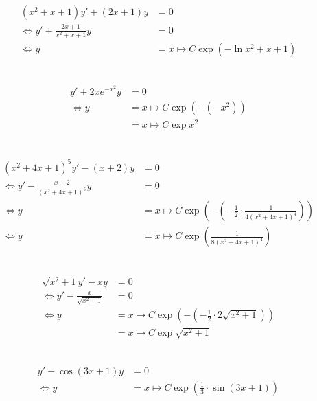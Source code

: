 \documentclass{article}
\begin{document}
\subsection{}

\begin{align*}
	(x^2 + x+1)y' + (2x+1)y &= 0 \\
	\iff y' + \frac{2x+1}{x^2+x+1}y &= 0 \\
	\iff y &= x \mapsto C \exp(-\ln x^2+x+1) \\
\end{align*}

\subsection{}

\begin{align*}
	y' + 2xe^{-x^2}y &= 0 \\
	\iff y &= x \mapsto C \exp (-(-x^2)) \\
	    &= x \mapsto C \exp x^2 \\
\end{align*}

\subsection{}
\begin{align*}
	(x^2+4x+1)^{5}y' - (x+2)y &= 0 \\
	\iff y' - \frac{x+2}{(x^2+4x+1)^{5}}y &= 0 \\
	\iff y &= x \mapsto C\exp \left( -\left(-\frac{1}{2}\cdot \frac{1}{4(x^2+4x+1)^{4}}\right)  \right)  \\
	\iff y&= x \mapsto C \exp\left( \frac{1}{8(x^2+4x+1)^{4}} \right)  \\
\end{align*}

\subsection{}
\begin{align*}
	\sqrt{x^2+1} y' - xy &= 0 \\
	\iff y' - \frac{x}{\sqrt{x^2+1} } &= 0 \\
	\iff y &= x \mapsto C\exp(-(-\frac{1}{2}\cdot 2\sqrt{x^2+1}))  \\
	       &= x \mapsto C\exp \sqrt{x^2+1} \\
\end{align*}

\subsection{}
\begin{align*}
	y'-\cos(3x+1)y&= 0 \\
	\iff y &= x\mapsto C\exp\left(\frac{1}{3} \cdot \sin(3x+1)\right) \\
\end{align*}
\end{document}
